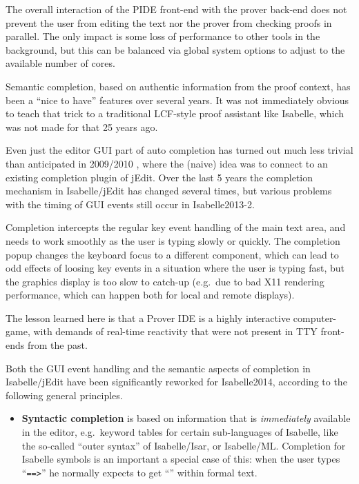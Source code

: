\begin{isabellebody}
\begin{isamarkuptext}
The overall interaction of the PIDE front-end with the prover back-end does
not prevent the user from editing the text nor the prover from checking
proofs in parallel. The only impact is some loss of performance to other
tools in the background, but this can be balanced via global system options
to adjust to the available number of cores.\end{isamarkuptext}\isamarkuptrue {}
\isamarkuptrue \begin{isamarkuptext}Semantic completion, based on authentic information from the proof
context, has been a ``nice to have'' features over several years. It was not
immediately obvious to teach that trick to a traditional LCF-style proof
assistant like Isabelle, which was not made for that 25 years ago.

Even just the editor GUI part of auto completion has turned out much less
trivial than anticipated in 2009/2010 \cite{Wenzel:2010}, where the (naive)
idea was to connect to an existing completion plugin of jEdit. Over the last
5 years the completion mechanism in Isabelle/jEdit has changed several
times, but various problems with the timing of GUI events still occur in
Isabelle2013-2.

Completion intercepts the regular key event handling of the main text area,
and needs to work smoothly as the user is typing slowly or quickly. The
completion popup changes the keyboard focus to a different component, which
can lead to odd effects of loosing key events in a situation where the user
is typing fast, but the graphics display is too slow to catch-up (e.g.\ due
to bad X11 rendering performance, which can happen both for local and remote
displays).

The lesson learned here is that a Prover IDE is a highly interactive
computer-game, with demands of real-time reactivity that were not present in
TTY front-ends from the past.

\medskip Both the GUI event handling and the semantic aspects of completion
in Isabelle/jEdit have been significantly reworked for Isabelle2014,
according to the following general principles.

\begin{itemize}

\item \textbf{Syntactic completion} is based on information that is
\emph{immediately} available in the editor, e.g.\ keyword tables for certain
sub-languages of Isabelle, like the so-called ``outer syntax'' of
Isabelle/Isar, or Isabelle/ML. Completion for Isabelle symbols is an
important a special case of this: when the user types ``\verb|==>|''
he normally expects to get ``\isa{{\isasymLongrightarrow}}'' within formal text.


\end{itemize}
\end{isamarkuptext}
\end{isabellebody}
